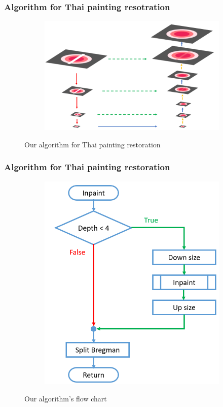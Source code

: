 \documentclass[xcolor=dvipsnames, xetex,serif]{beamer}
\begin{document}
    \begin{frame}
		\frametitle{Algorithm for Thai painting resotration}
		\begin{figure}[H]
			\centering
			\begin{subfigure}{0.7\linewidth}
				\centering
				\includegraphics[width=1\linewidth]{images/method_thaiart/step_thaiart.png}
			\end{subfigure}
			\caption{Our algorithm for Thai painting restoration}
        \end{figure}
	\end{frame}
	\begin{frame}
		\frametitle{Algorithm for Thai painting restoration}
		\begin{figure}[H]
			\centering
			\begin{subfigure}{0.5\linewidth}
				\centering
				\includegraphics[width=1\linewidth]{images/method_thaiart/flowchart_thaiart.png}
			\end{subfigure}
			\caption{Our algorithm's flow chart}
		\end{figure}
	\end{frame}
\end{document}
